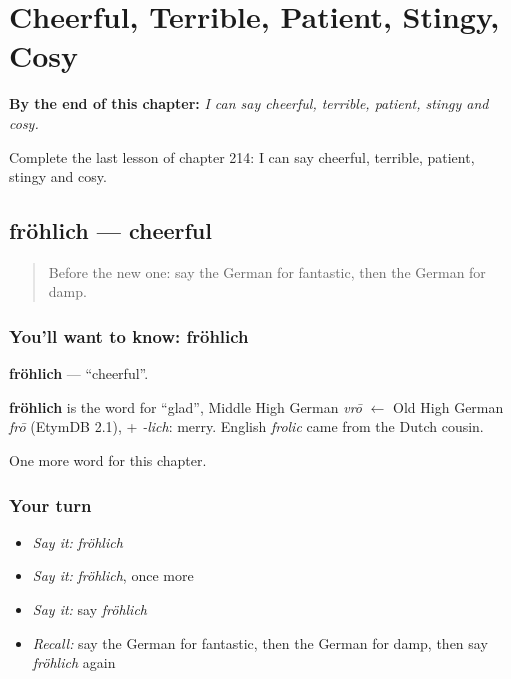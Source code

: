 
\chapter{Cheerful, Terrible, Patient, Stingy, Cosy}
\label{ch:ge-cheerful-terrible-patient-stingy-cosy}

\begin{chapteropening}
\textbf{By the end of this chapter:} \emph{I can say cheerful, terrible, patient, stingy and cosy.}

Complete the last lesson of chapter 214: I can say cheerful, terrible, patient, stingy and cosy.
\end{chapteropening}

\section[fröhlich]{fröhlich — cheerful}

\label{lesson:GE-C214-froehlich}



\begin{quote}
Before the new one: say the German for fantastic, then the German for damp.
\end{quote}

\subsection*{You'll want to know: fröhlich}
\textbf{fröhlich} — \textquotedblleft{}cheerful\textquotedblright{}.

\begin{cousinweb}
\textbf{fröhlich} is the word for \textquotedblleft{}glad\textquotedblright{}, Middle High German \emph{vrō} $\leftarrow$ Old High German \emph{frō} (EtymDB 2.1), + \emph{-lich}: merry. English \emph{frolic} came from the Dutch cousin.
\end{cousinweb}

\begin{grammarlens}[title={What you've built}]
One more word for this chapter.
\end{grammarlens}

\subsection*{Your turn}
\begin{itemize}
\raggedright
  \item \emph{Say it:} \emph{fröhlich}
  \item \emph{Say it:} \emph{fröhlich}, once more
  \item \emph{Say it:} say \emph{fröhlich}
  \item \emph{Recall:} say the German for fantastic, then the German for damp, then say \emph{fröhlich} again
\end{itemize}

